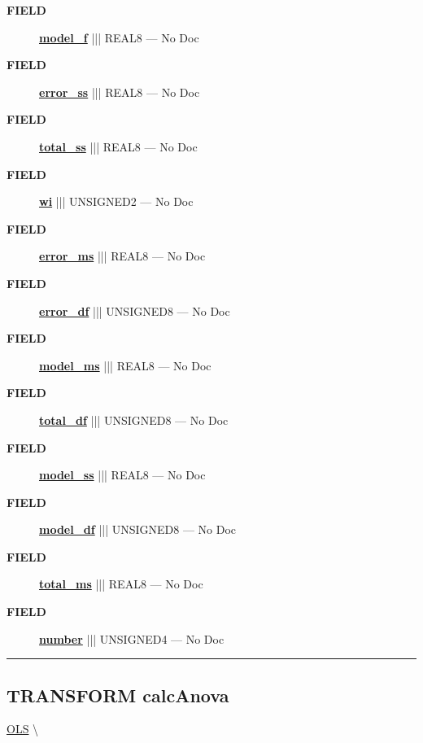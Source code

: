 \par
\begin{description}
\item [\colorbox{tagtype}{\color{white} \textbf{\textsf{FIELD}}}] \textbf{\underline{model\_f}} ||| REAL8 --- No Doc
\item [\colorbox{tagtype}{\color{white} \textbf{\textsf{FIELD}}}] \textbf{\underline{error\_ss}} ||| REAL8 --- No Doc
\item [\colorbox{tagtype}{\color{white} \textbf{\textsf{FIELD}}}] \textbf{\underline{total\_ss}} ||| REAL8 --- No Doc
\item [\colorbox{tagtype}{\color{white} \textbf{\textsf{FIELD}}}] \textbf{\underline{wi}} ||| UNSIGNED2 --- No Doc
\item [\colorbox{tagtype}{\color{white} \textbf{\textsf{FIELD}}}] \textbf{\underline{error\_ms}} ||| REAL8 --- No Doc
\item [\colorbox{tagtype}{\color{white} \textbf{\textsf{FIELD}}}] \textbf{\underline{error\_df}} ||| UNSIGNED8 --- No Doc
\item [\colorbox{tagtype}{\color{white} \textbf{\textsf{FIELD}}}] \textbf{\underline{model\_ms}} ||| REAL8 --- No Doc
\item [\colorbox{tagtype}{\color{white} \textbf{\textsf{FIELD}}}] \textbf{\underline{total\_df}} ||| UNSIGNED8 --- No Doc
\item [\colorbox{tagtype}{\color{white} \textbf{\textsf{FIELD}}}] \textbf{\underline{model\_ss}} ||| REAL8 --- No Doc
\item [\colorbox{tagtype}{\color{white} \textbf{\textsf{FIELD}}}] \textbf{\underline{model\_df}} ||| UNSIGNED8 --- No Doc
\item [\colorbox{tagtype}{\color{white} \textbf{\textsf{FIELD}}}] \textbf{\underline{total\_ms}} ||| REAL8 --- No Doc
\item [\colorbox{tagtype}{\color{white} \textbf{\textsf{FIELD}}}] \textbf{\underline{number}} ||| UNSIGNED4 --- No Doc
\end{description}





\rule{\linewidth}{0.5pt}
\subsection*{\textsf{\colorbox{headtoc}{\color{white} TRANSFORM}
calcAnova}}

\hypertarget{ecldoc:linearregression.ols.calcanova}{}
\hspace{0pt} \hyperlink{ecldoc:linearregression.ols}{OLS} \textbackslash 

